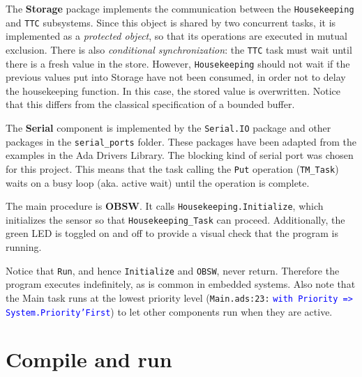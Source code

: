 The \textbf{Storage} package implements the communication between the \texttt{Housekeeping} and \texttt{TTC} subsystems. 
Since this object is shared by two concurrent tasks, it is implemented as a \textit{protected object},
so that its operations are executed in mutual exclusion.
There is also \textit{conditional synchronization}:
the \texttt{TTC} task must wait until there is a fresh value in the store.
However, \texttt{Housekeeping} should not wait if the previous values put into Storage have not been consumed, in order not to delay the housekeeping function.
In this case, the stored value is overwritten. Notice that this differs from the classical specification of a bounded buffer.

The \textbf{Serial} component is implemented by the \texttt{Serial.IO} package and other packages in the \textcolor{mPurple}{\texttt{serial\_ports}} folder.
These packages have been adapted from the examples in the Ada Drivers Library.
The blocking kind of serial port was chosen for this project.
This means that the task calling the \texttt{Put} operation (\texttt{TM\_Task}) waits on a busy loop (aka. active wait) until the operation is complete.

The main procedure is \textbf{OBSW}.
It calls \texttt{Housekeeping.Initialize},
which initializes the sensor so that \texttt{Housekeeping\_Task} can proceed.
Additionally, the green LED is toggled on and off to provide a visual check that the program is running.

Notice that \texttt{Run}, and hence \texttt{Initialize} and \texttt{OBSW}, never return. Therefore the program executes indefinitely, as is common in embedded systems.
Also note that the Main task runs at the lowest priority level
(\textcolor{mGreen}{\texttt{Main.ads:23:}} \textcolor{blue}{\texttt{with Priority => System.Priority'First}}) to let other components run when they are active.

\section{Compile and run}\label{sec:ass-2:compile-run}

